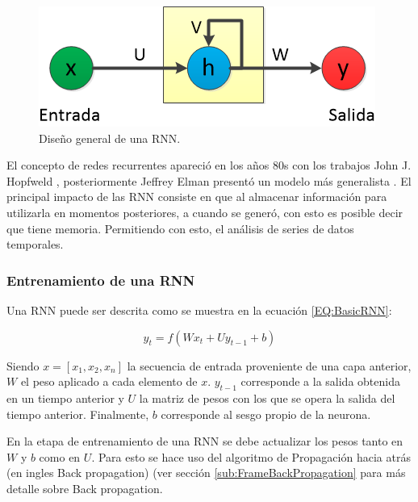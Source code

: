         \begin{figure}[ht!]
        	\centering
        	\includegraphics[width=0.6\linewidth]{imgs/02-Referential/02-arch-rnn-general.png}
        	\caption[Diseño general de una RNN]{Diseño general de una RNN.}
    	    \label{fig:RNN-basic}
        \end{figure}%
        
        El concepto de redes recurrentes apareció en los años 80s con los trabajos John J. Hopfweld \cite{Hopfield1982RNN}, posteriormente Jeffrey Elman presentó un modelo más generalista \cite{Elman1990RNN}. El principal impacto de las RNN consiste en que al almacenar información para utilizarla en momentos posteriores, a cuando se generó, con esto es posible decir que tiene memoria. Permitiendo con esto, el análisis de series de datos temporales. 
        
        \subsubsection{Entrenamiento de una RNN}
            Una RNN puede ser descrita como se muestra en la ecuación \ref{EQ:BasicRNN}:
        
            \begin{equation}
                \label{EQ:BasicRNN}
                y_t = f(Wx_t + Uy_{t-1} + b)
            \end{equation}
            
            Siendo $x=[x_1,x_2,x_n]$ la secuencia de entrada proveniente de una capa anterior, $W$ el peso aplicado a cada elemento de $x$. $y_{t-1}$ corresponde a la salida obtenida en un tiempo anterior y $U$ la matriz de pesos con los que se opera la salida del tiempo anterior. Finalmente, $b$ corresponde al sesgo propio de la neurona.
        
            En la etapa de entrenamiento de una RNN se debe actualizar los pesos tanto en $W$ y $b$ como en $U$. Para esto se hace uso del algoritmo de Propagación hacia atrás (en ingles Back propagation) (ver sección \ref{sub:FrameBackPropagation} para más detalle sobre Back propagation.
            
